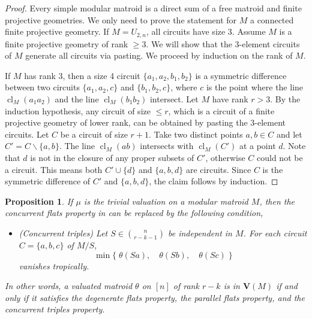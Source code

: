 \documentclass{article}
\newtheorem{proposition}[theorem]{Proposition}
\theoremstyle{definition}
\newcommand{\cl}{\operatorname{cl}}
\newcommand{\nk}[2]{\binom{#1}{#2}}
\newcommand{\bV}{\mathbf V}
\begin{document}
\begin{proof}
    Every simple modular matroid is a direct sum of a free matroid and finite projective geometries. We only need to prove the statement for $M$ a connected finite projective geometry. If $M=U_{2,n}$, all circuits have size 3. Assume $M$ is a finite projective geometry of rank $\geq 3$. We will 
    show that the 3-element circuits of $M$ generate all circuits via pasting. We proceed by induction on the rank of $M$.

    If $M$ has rank 3, then a size 4 circuit $\{a_1,a_2,b_1,b_2\}$ is a symmetric difference between two circuits $\{a_1,a_2,c\}$ and $\{b_1,b_2,c\}$, where $c$ is the point where the line $\cl_M(a_1a_2)$ and the line $\cl_M(b_1b_2)$ intersect. Let $M$ have rank $r>3$. By the induction hypothesis, any circuit of size $\leq r$, which is a circuit of a finite projective geometry of lower rank, can be obtained by pasting the 3-element circuits. Let $C$ be a circuit of size $r+1$. Take two distinct points $a,b\in C$ and let $C'=C\smallsetminus\{a,b\}$. The line $\cl_M(ab)$ intersects with $\cl_M(C')$ at a point $d$. Note that $d$ is not in the closure of any proper subsets of $C'$, otherwise $C$ could not be a circuit. This means both $C'\cup \{d\}$ and $\{a,b,d\}$ are  circuits. Since $C$ is the symmetric difference of $C'$ and $\{a,b,d\}$, the claim follows by induction.
\end{proof}

\begin{proposition}\label{prop:3-term-incidence}
    If $\mu$ is the trivial valuation on a modular matroid $M$, then the concurrent flats property in  can be replaced by the following condition,
    \begin{itemize}
        \item \emph{(Concurrent triples)} Let $S\in \nk{n}{r-k-1}$ be independent in $M$. For each circuit $C=\{a,b,c\}$ of $M/S$, 
        \begin{equation}\label{eqn:concurrent-triple-relation}
            \min\{\;\theta(Sa),\quad \theta(Sb), \quad \theta(Sc)\;\}
        \end{equation}
        vanishes tropically.
    \end{itemize}
    In other words, a valuated matroid $\theta$ on $[n]$ of rank $r-k$ is in $\bV(M)$ if and only if it satisfies the degenerate flats property, the parallel flats property, and the concurrent triples property.
\end{proposition}
\end{document}
